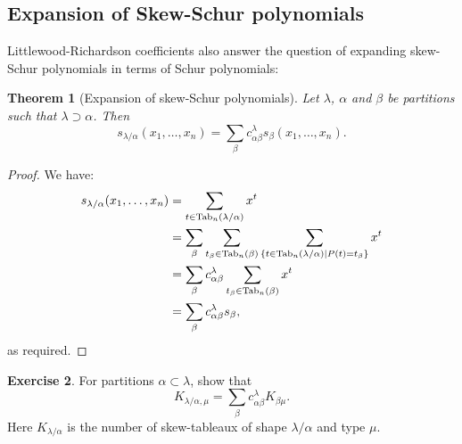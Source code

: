 \documentclass[11pt]{amsproc}
\newtheorem{theorem}{Theorem}[subsection]
\theoremstyle{definition}
\theoremstyle{example}
\newtheorem{exercise}[theorem]{Exercise}
\newcommand{\Tab}{\textup{Tab}}
\begin{document}
\subsection{Expansion of Skew-Schur polynomials}
\label{sec:skew-lr}
Littlewood-Richardson coefficients also answer the question of expanding skew-Schur polynomials in terms of Schur polynomials:
\begin{theorem}
  [Expansion of skew-Schur polynomials]
  \label{theorem:skew-exp}
  Let $\lambda$, $\alpha$ and $\beta$ be partitions such that $\lambda\supset \alpha$.
  Then
  \begin{displaymath}
    s_{\lambda/\alpha}(x_1,\dotsc,x_n) = \sum_\beta c^\lambda_{\alpha\beta}s_\beta(x_1,\dotsc,x_n).
  \end{displaymath}
\end{theorem}
\begin{proof}
  We have:
  \begin{align*}
    s_{\lambda/\alpha}(x_1,\dotsc,x_n) & = \sum_{t\in \Tab_n(\lambda/\alpha)} x^t\\
      & = \sum_\beta \sum_{t_\beta\in \Tab_n(\beta)} \sum_{\{t\in \Tab_n(\lambda/\alpha)\mid P(t)=t_\beta\}} x^t\\
      & = \sum_\beta c^\lambda_{\alpha\beta} \sum_{t_\beta\in \Tab_n(\beta)} x^t\\
      & = \sum_\beta c^\lambda_{\alpha\beta} s_\beta,
  \end{align*}
  as required.
\end{proof}
\begin{exercise}
  For partitions $\alpha\subset \lambda$, show that
  \begin{displaymath}
    K_{\lambda/\alpha,\mu} = \sum_\beta c^\lambda_{\alpha\beta} K_{\beta\mu}.
  \end{displaymath}
  Here $K_{\lambda/\alpha}$ is the number of skew-tableaux of shape $\lambda/\alpha$ and type $\mu$.
\end{exercise}
\end{document}
